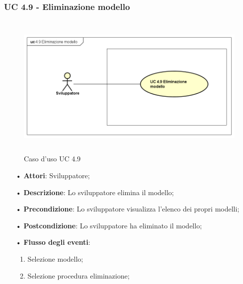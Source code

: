 \subsubsection{UC 4.9 - Eliminazione modello}
\begin{figure}[H]
	\centering
	\includegraphics[width=17cm, height=7cm]{img/UC490.png} 
	\caption{Caso d'uso UC 4.9}\label{fig:490}
\end{figure}
\begin{itemize}
	\item[•]\textbf{Attori}: Sviluppatore;
	\item[•]\textbf{Descrizione}: Lo sviluppatore elimina il modello;
	\item[•]\textbf{Precondizione}: Lo sviluppatore visualizza l'elenco dei propri modelli;
	\item[•]\textbf{Postcondizione}: Lo sviluppatore ha eliminato il modello; 
	\item[•]\textbf{Flusso degli eventi}: 
	\begin{enumerate}
		\item Selezione modello;
		\item Selezione procedura eliminazione;
	\end{enumerate}   
\end{itemize}